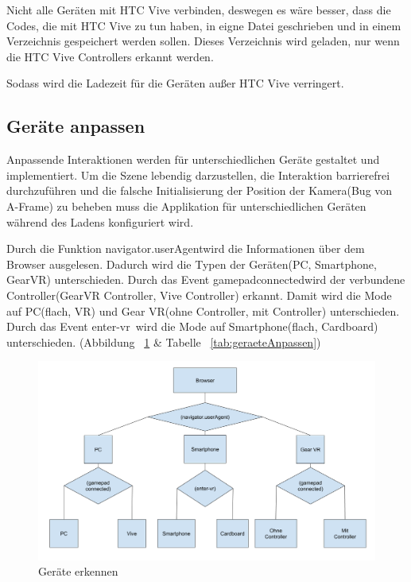   Nicht alle Geräten mit HTC Vive verbinden, deswegen es wäre besser, dass die Codes, die mit HTC Vive zu tun haben, in eigne Datei geschrieben und in einem Verzeichnis gespeichert werden sollen. Dieses Verzeichnis wird geladen, nur wenn die HTC Vive Controllers erkannt werden.
  
  Sodass wird die Ladezeit für die Geräten außer HTC Vive verringert.
  
 \subsection{Geräte anpassen}
 Anpassende Interaktionen werden für unterschiedlichen Geräte gestaltet und implementiert. Um die Szene lebendig darzustellen, die Interaktion barrierefrei durchzuführen und die falsche Initialisierung der Position der Kamera(Bug von A-Frame) zu beheben muss die Applikation für unterschiedlichen Geräten während des Ladens konfiguriert wird.
 
 Durch die Funktion \glqq navigator.userAgent\grqq wird die Informationen über dem Browser ausgelesen. Dadurch wird die Typen der Geräten(PC, Smartphone, GearVR) unterschieden. Durch das Event \glqq gamepadconnected\grqq wird der verbundene Controller(GearVR Controller, Vive Controller) erkannt. Damit wird die Mode auf PC(flach, VR) und Gear VR(ohne Controller, mit Controller) unterschieden. Durch das Event \glqq enter-vr\grqq\ wird die Mode auf Smartphone(flach, Cardboard) unterschieden. (Abbildung ~\ref{fig:geraeteAnpassen} \& Tabelle ~\ref{tab:geraeteAnpassen}) 
 

\begin{figure}[ht]
\vspace*{0.3cm}
\centering
\includegraphics[width=\textwidth]{images/geraeteAnpassen.png}
\caption[Geräte erkennen]{Geräte erkennen}
\label{fig:geraeteAnpassen} 
\end{figure}

